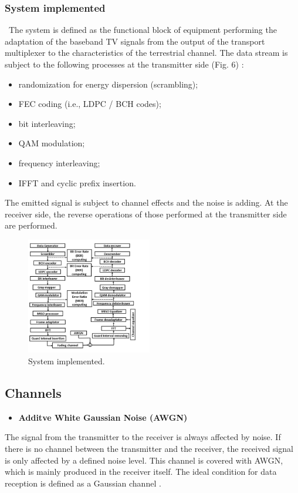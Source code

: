 \documentclass[10pt, conference]{IEEEtran}
\begin{document}
\linespread{1.8}
\subsubsection{System implemented}
\
The system is defined as the functional block of equipment
 performing the adaptation of the baseband TV signals from
 the output of the transport multiplexer to the characteristics
 of the terrestrial channel. The data stream is subject to the
 following processes at the transmitter side (Fig. 6) \cite{14}:
\begin{itemize}
    \item randomization for energy dispersion (scrambling);
    \item FEC coding (i.e., LDPC / BCH codes);
    \item bit interleaving;
    \item QAM modulation;
    \item frequency interleaving;
    \item IFFT and cyclic prefix insertion.
\end{itemize}
The emitted signal is subject to channel effects and the noise
 is adding. At the receiver side, the reverse operations of those
 performed at the transmitter side are performed.

\begin{figure}[!htbp]
 \centering
    \includegraphics[width=0.488\textwidth]{images/6em_image.png}
    \caption{ System implemented.}
\end{figure}


\subsection{Channels}
\begin{itemize}
    \item \textbf{ Additve White Gaussian Noise (AWGN)}
\end{itemize}
\normalsize{ The signal from the transmitter to the receiver is always
 affected by noise. If there is no channel between the
 transmitter and the receiver, the received signal is only
 affected by a defined noise level. This channel is covered
 with AWGN, which is mainly produced in the receiver
 itself. The ideal condition for data reception is defined as
 a Gaussian channel \cite{18}.
 }
\end{document}
